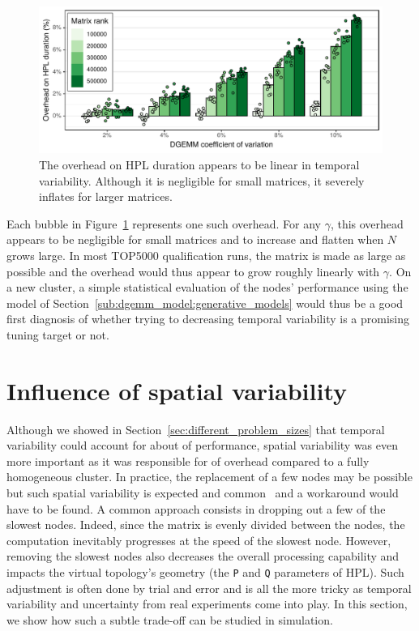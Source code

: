         \begin{figure}[htpb]
            \centering
            \includegraphics[width=\linewidth]{img/prediction/sensibility/temporal/whatif_variability.pdf}

            \caption{The overhead on HPL duration appears to be linear in \dgemm temporal variability. Although
            it is negligible for small matrices, it severely inflates for larger matrices.}
            \label{fig:whatif_variability}
        \end{figure}

        Each bubble in Figure~\ref{fig:whatif_variability} represents one such overhead. For any \(\gamma\), this
        overhead appears to be negligible for small matrices and to increase and flatten when \(N\) grows large. In most
        TOP5000 qualification runs, the matrix is made as large as possible and the overhead would thus appear to grow
        roughly linearly with \(\gamma\). On a new cluster, a simple statistical evaluation of the nodes' performance
        using the model of Section~\ref{sub:dgemm_model:generative_models} would thus be a good first diagnosis of
        whether trying to decreasing temporal variability is a promising tuning target or not.

    \section{Influence of \dgemm spatial variability}%
    \label{sec:influence_of_spatial_variability}
        Although we showed in Section~\ref{sec:different_problem_sizes} that temporal variability could account for
        about  of performance, spatial variability was even more important as it was responsible for
         of overhead compared to a fully homogeneous cluster. In practice, the replacement of a few
        nodes may be possible but such spatial variability is expected and common~\cite{rountree_15} and a workaround
        would have to be found. A common approach consists in dropping out a few of the slowest nodes. Indeed, since the
        matrix is evenly divided between the nodes, the computation inevitably progresses at the speed of the slowest
        node. However, removing the slowest nodes also decreases the overall processing capability and impacts the
        virtual topology's geometry (the \texttt{P} and \texttt{Q} parameters of HPL). Such adjustment is often done by
        trial and error and is all the more tricky as temporal variability and uncertainty from real experiments come
        into play. In this section, we show how such a subtle trade-off can be studied in simulation.

